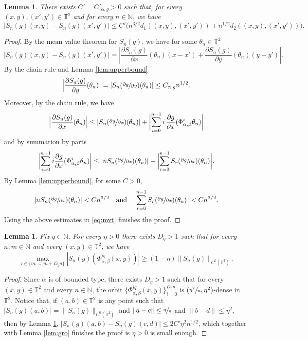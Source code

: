 \documentclass[10pt]{amsart}
\theoremstyle{definition}
\theoremstyle{plain}
\newtheorem{lemma}[definition]{Lemma}
\newcommand\NN{\mathbb{N}}
\newcommand\TT{\mathbb{T}}
\begin{document}
\begin{lemma}\label{lem:diver} There exists $C'=C'_{\alpha,g}>0$ such that, for every $(x,y),(x',y')\in \TT^2$ and for every $n\in \NN$, we have
\[
|S_{n}(g)(x,y)-S_{n}(g)(x',y')|\leq C'\bigl(n^{3/2}d_1((x,y),(x',y'))+n^{1/2}d_2((x,y),(x',y'))\bigr).
\]
\end{lemma}
\begin{proof} By the mean value theorem for $S_{n}(g)$, we have for some $\theta_n\in \TT^2$
\begin{equation}\label{eq:mvt}
|S_{n}(g)(x,y)-S_{n}(g)(x',y')|=\left|\frac{\partial S_{n}(g)}{\partial x}(\theta_n)(x-x')+
\frac{\partial S_{n}(g)}{\partial y}(\theta_n)(y-y')\right|.
\end{equation}
By the chain rule and Lemma \ref{lem:upperbound}
\[
\Bigl|\frac{\partial S_{n}(g)}{\partial y}(\theta_n)\Bigr|=|S_n(\sfrac{\partial g}{\partial y})(\theta_n)|\leq C_{\alpha,g}n^{1/2}.
\]
Moreover, by the chain rule, we have
\[
\Bigl|\frac{\partial S_{n}(g)}{\partial x}(\theta_n)\Bigr|\leq
|S_n(\sfrac{\partial g}{\partial x})(\theta_n)|+
\biggl|\sum_{i=0}^{n-1}i\,\frac{\partial g}{\partial x}(\Phi_{\alpha,\beta} ^i\theta_n)\biggr|
\]
and by summation by parts
\[
\biggl|\sum_{i=0}^{n-1}i\frac{\partial g}{\partial x}(\Phi_{\alpha,\beta} ^i\theta_n)\biggr|\leq
|nS_n(\sfrac{\partial g}{\partial x})(\theta_n)|+\biggl|\sum_{r=0}^{n-1}S_r(\sfrac{\partial g}{\partial x})(\theta_n)\biggr|.
\]
By Lemma \ref{lem:upperbound}, for some $C>0$,
\[
|nS_n(\sfrac{\partial g}{\partial x})(\theta_n)|<Cn^{3/2}\quad\text{and} \quad
\biggl|\sum_{r=0}^{n-1}S_r(\sfrac{\partial g}{\partial x})(\theta_n)\biggr|<Cn^{3/2}.
\]
Using the above estimates in \eqref{eq:mvt} finishes the proof.
\end{proof}

\begin{lemma}\label{lem:lowbound}Fix $q\in \NN$. For every $\eta>0$ there exists $D_\eta>1$ such that for every $n,m\in \NN$ and every $(x,y)\in \TT^2$, we have
\[
\max_{i\in\{m,\dots,m+D_\eta n\}}|S_{n}(g)(\Phi_{\alpha,\beta}^{iq}(x,y))|\geq (1-\eta)\|S_{n}(g)\|_{C^0(\TT^2)}.
\]
\end{lemma}
\begin{proof} Since $\alpha$ is of bounded type, there exists $D_\eta\!>\!1$ such that for every \hbox{$(x,y)\!\in\!\TT^2$} and every $n\in \NN$, the orbit $\{\Phi_{\alpha,\beta}^{iq}(x,y)\}_{i=0}^{D_\eta n}$ is $(\sfrac{\eta^2}{n},\eta^2)$-dense in $\TT^2$. Notice that, if $(a,b)\in \TT^2$ is any point such that
$|S_n(g)(a,b)|=\|S_{n}(g)\|_{C^0(\TT^2)}$ and $\|a-c\|\leq \sfrac{\eta}{n}$ and $\|b-d\|\leq \eta^2$, then by Lemma \ref{lem:diver},
$|S_n(g)(a,b)-S_n(g)(c,d)|\leq 2C'\eta^2 n^{1/2}$, which together with Lemma \ref{lem:gro} finishes the proof is $\eta>0$ is small enough.
\end{proof}
\end{document}
